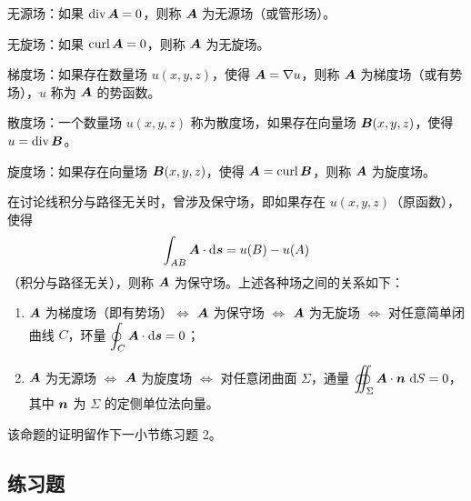 无源场：如果 $\operatorname{div}\bm{A}=0$，则称 $\bm{A}$ 为无源场（或管形场）。

无旋场：如果 $\operatorname{curl}\bm{A}=0$，则称 $\bm{A}$ 为无旋场。

梯度场：如果存在数量场 $u(x,y,z)$，使得 $\bm{A}=\nabla u$，则称 $\bm{A}$ 为梯度场（或有势场），$u$ 称为 $\bm{A}$ 的势函数。

散度场：一个数量场 $u(x,y,z)$ 称为散度场，如果存在向量场 $\bm{B}(x,y,z)$，使得 $u=\operatorname{div}\bm{B}$。

旋度场：如果存在向量场 $\bm{B}(x,y,z)$，使得 $\bm{A}=\operatorname{curl}\bm{B}$，则称 $\bm{A}$ 为旋度场。

在讨论线积分与路径无关时，曾涉及保守场，即如果存在 $u(x,y,z)$（原函数），使得
\[
  \int_{AB}\bm{A}\cdot\mathop{}\!\mathrm{d}\bm{s}=u(B)-u(A)
\]
（积分与路径无关），则称 $\bm{A}$ 为保守场。上述各种场之间的关系如下：

\begin{xproposition}[26.1.1]
\begin{enumerate}[label=(\arabic*)]
  \item $\bm{A}$ 为梯度场（即有势场）$\Longleftrightarrow$ $\bm{A}$ 为保守场 $\Longleftrightarrow$ $\bm{A}$ 为无旋场 $\Longleftrightarrow$ 对任意简单闭曲线 $C$，环量 $\displaystyle\oint_C\bm{A}\cdot\mathop{}\!\mathrm{d}\bm{s}=0$；
  \item $\bm{A}$ 为无源场 $\Longleftrightarrow$ $\bm{A}$ 为旋度场 $\Longleftrightarrow$ 对任意闭曲面 $\Sigma$，通量 $\displaystyle\oiint_\Sigma\bm{A}\cdot\bm{n}\,\mathop{}\!\mathrm{d} S=0$，其中 $\bm{n}$ 为 $\Sigma$ 的定侧单位法向量。
\end{enumerate}
\end{xproposition}

该命题的证明留作下一小节练习题 2。

\subsection{练习题}

